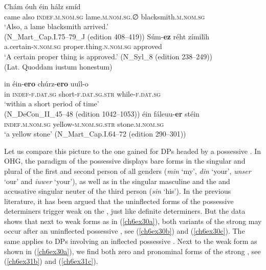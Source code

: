 \documentclass[output=paper,colorlinks,citecolor=brown]{langscibook}
\begin{document}
\begin{exe}
\ex\label{ch6ex28}\begin{xlist}
\ex\label{ch6ex28a}
\gll Chám óuh éin hálz smíd\\
came also \textsc{indef.m.nom.sg} lame.\textsc{m.nom.sg.∅} blacksmith.\textsc{m.nom.sg}\\
\glt `Also, a lame blacksmith arrived.' \\ (N\_Mart\_Cap.I.75--79\_J (edition 408--419))
\ex\label{ch6ex28b} 
\gll Súm-\textbf{ez} réht zímilîh\\
a.certain-\textsc{n.nom.sg} proper.thing.\textsc{n.nom.sg} approved\\
\glt `A certain proper thing is approved.' (N\_Syl\_8 (edition 238--249))\\
(Lat. Quoddam iustum honestum)
\end{xlist}
\end{exe}

\begin{exe}
\ex\label{ch6ex29}\begin{xlist}
\ex\label{ch6ex29a}
\gll in éin-\textbf{ero} chúrz-\textbf{ero} uuîl-o \\
in \textsc{indef-f.dat.sg} short-\textsc{f.dat.sg.str} while-\textsc{f.dat.sg}\\
\glt `within a short period of time' \\ (N\_DeCon\_II\_45--48 (edition 1042--1053))
\ex\label{ch6ex29b} 
\gll éin fáleuu-\textbf{er} stéin\\
\textsc{indef.m.nom.sg} yellow-\textsc{m.nom.sg.str} stone.\textsc{m.nom.sg}\\
\glt `a yellow stone' (N\_Mart\_Cap.I.64--72 (edition 290--301))
\end{xlist}
\end{exe}

Let us compare this picture to the one gained for DPs headed by a
possessive . In OHG, the paradigm of the possessive 
displays bare forms in the  singular and plural of the first
and second person of all genders (\emph{min} `my', \emph{din} `your',
\emph{unser} `our' and \emph{iuwer} `your'), as well as in the
 singular masculine and the  and accusative singular
neuter of the third person (\emph{sin} `his'). In the previous
literature, it has been argued that the uninflected forms of the
possessive determiners trigger weak  on the , just
like definite determiners. But the  data shows that next to weak
forms as in (\ref{ch6ex30a}), both variants of the strong  may occur after
an uninflected possessive , see (\ref{ch6ex30b}) and (\ref{ch6ex30c}). The same applies to
DPs involving an inflected possessive . Next to the weak form
as shown in (\ref{ch6ex30a}), we find both zero and pronominal forms of the strong
, see (\ref{ch6ex31b}) and (\ref{ch6ex31c}).
\end{document}
